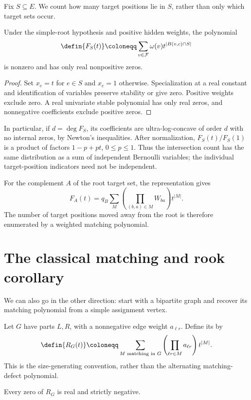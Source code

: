 Fix $S\subseteq E$. We count how many target positions lie in $S$, rather
than only which target sets occur.

\begin{corollary}
Under the simple-root hypothesis and positive hidden weights, the polynomial
\[
 \defin{F_S(t)}\coloneqq
 \sum_{v\in\mathcal F}\omega(v)t^{|B(v,c)\cap S|}
\]
is nonzero and has only real nonpositive zeros.
\end{corollary}

\begin{proof}
Set $x_e=t$ for $e\in S$ and $x_e=1$ otherwise. Specialization at a real
constant and identification of variables preserve stability or give zero.
Positive weights exclude zero. A real univariate stable polynomial has
only real zeros, and nonnegative coefficients exclude positive zeros.
\end{proof}

In particular, if $d=\deg F_S$, its coefficients are ultra-log-concave
of order $d$ with no internal zeros, by Newton's inequalities.
After normalization, $F_S(t)/F_S(1)$ is a product of factors
$1-p+pt$, $0\leq p\leq1$. Thus the intersection count has the same
distribution as a sum of independent Bernoulli variables; the individual
target-position indicators need not be independent.

For the complement $A$ of the root target set, the representation gives
\[
 F_A(t)=q_B\sum_M\left(\prod_{(b,a)\in M}W_{ba}\right)t^{|M|}.
\]
The number of target positions moved away from the root is therefore
enumerated by a weighted matching polynomial.

\section[rookPolynomialCorollary]{The classical matching and rook corollary}

We can also go in the other direction: start with a bipartite graph and
recover its matching polynomial from a simple assignment vertex.

Let $G$ have parts $L,R$, with a nonnegative edge weight $a_{\ell r}$.
Define its  by
\[
 \defin{R_G(t)}\coloneqq
 \sum_{M\text{ matching in }G}
       \left(\prod_{\ell r\in M}a_{\ell r}\right)t^{|M|}.
\]
This is the size-generating convention, rather than the alternating
matching-defect polynomial.

\begin{corollary}
Every zero of $R_G$ is real and strictly negative.
\end{corollary}

